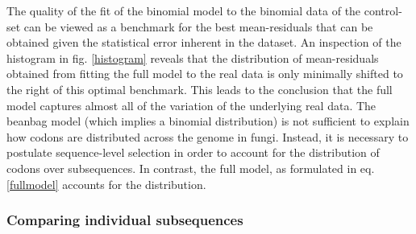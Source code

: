 \documentclass[a4paper,10pt]{paper}%
\begin{document}
\par
The quality of the   fit of the binomial model to the  binomial  data of the control-set can be viewed as a benchmark for the best mean-residuals that can be obtained given the statistical error  inherent in the dataset. An inspection of the histogram in fig. \ref{histogram} reveals  that the  distribution of mean-residuals obtained from fitting  the  full model to the real data is only minimally shifted to the right of this optimal benchmark. This leads to  the conclusion that the full model captures almost all of the variation of the underlying real data. The beanbag model (which implies a binomial distribution) is not sufficient to explain  how codons are distributed across the genome in fungi. Instead, it  is necessary to postulate sequence-level selection in order to account for the distribution of codons over subsequences. In contrast, the full model, as formulated in eq. \ref{fullmodel} accounts for the distribution.

\subsubsection{Comparing individual subsequences}
\end{document}
